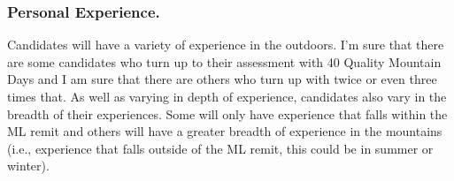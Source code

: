 \documentclass[
  12pt,
  a4paper,
]{book}
\begin{document}
\hypertarget{personal-experience.}{%
\subsubsection{Personal Experience.}\label{personal-experience.}}

Candidates will have a variety of experience in the outdoors. I'm sure that there are some candidates who turn up to their assessment with 40 Quality Mountain Days and I am sure that there are others who turn up with twice or even three times that. As well as varying in depth of experience, candidates also vary in the breadth of their experiences. Some will only have experience that falls within the ML remit and others will have a greater breadth of experience in the mountains (i.e., experience that falls outside of the ML remit, this could be in summer or winter).
\end{document}
